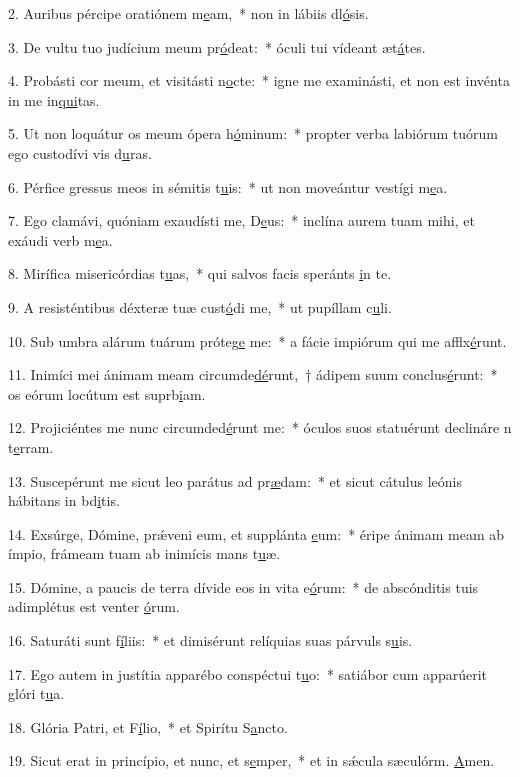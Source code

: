2. Auribus pércipe oratiónem m\uline{e}am,~* non in lábiis dl\uline{ó}sis.\par 
3. De vultu tuo judícium meum pr\uline{ó}deat:~* óculi tui vídeant æt\uline{á}tes.\par 
4. Probásti cor meum, et visitásti n\uline{o}cte:~* igne me examinásti, et non est invénta in me in\uline{qui}tas.\par 
5. Ut non loquátur os meum ópera h\uline{ó}minum:~* propter verba labiórum tuórum ego custodívi vis d\uline{u}ras.\par 
6. Pérfice gressus meos in sémitis t\uline{u}is:~* ut non moveántur vestígi m\uline{e}a.\par 
7. Ego clamávi, quóniam exaudísti me, D\uline{e}us:~* inclína aurem tuam mihi, et exáudi verb m\uline{e}a.\par 
8. Mirífica misericórdias t\uline{u}as,~* qui salvos facis speránts \uline{i}n te.\par 
9. A resisténtibus déxteræ tuæ cust\uline{ó}di me,~* ut pupíllam c\uline{u}li.\par 
10. Sub umbra alárum tuárum próteg\uline{e} me:~* a fácie impiórum qui me afflx\uline{é}runt.\par 
11. Inimíci mei ánimam meam circumde\uline{dé}runt,~† ádipem suum conclus\uline{é}runt:~* os eórum locútum est suprb\uline{i}am.\par 
12. Projiciéntes me nunc circumded\uline{é}runt me:~* óculos suos statuérunt declináre n t\uline{e}rram.\par 
13. Suscepérunt me sicut leo parátus ad pr\uline{æ}dam:~* et sicut cátulus leónis hábitans in bd\uline{i}tis.\par 
14. Exsúrge, Dómine, prǽveni eum, et supplánta \uline{e}um:~* éripe ánimam meam ab ímpio, frámeam tuam ab inimícis mans t\uline{u}æ.\par 
15. Dómine, a paucis de terra dívide eos in vita e\uline{ó}rum:~* de abscónditis tuis adimplétus est venter \uline{ó}rum.\par 
16. Saturáti sunt f\uline{í}liis:~* et dimisérunt relíquias suas párvuls s\uline{u}is.\par 
17. Ego autem in justítia apparébo conspéctui t\uline{u}o:~* satiábor cum apparúerit glóri t\uline{u}a.\par 
18. Glória Patri, et F\uline{í}lio,~* et Spirítu S\uline{a}ncto.\par 
19. Sicut erat in princípio, et nunc, et s\uline{e}mper,~* et in sǽcula sæculórm. \uline{A}men.\par 
